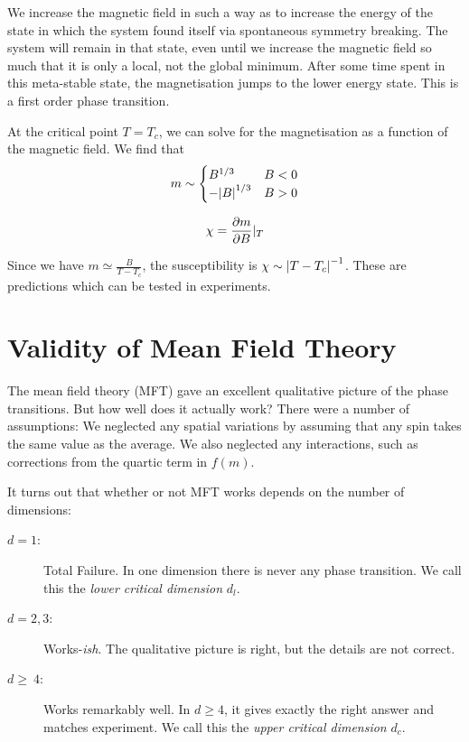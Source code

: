 We increase the magnetic field in such a way as to increase the energy of the state in which the system found itself via spontaneous symmetry breaking.
The system will remain in that state, even until we increase the magnetic field so much that it is only a local, not the global minimum.
After some time spent in this meta-stable state, the magnetisation jumps to the lower energy state.
This is a first order phase transition.

At the critical point $T = T_c$, we can solve for the magnetisation as a function of the magnetic field. We find that 
\begin{equation}
  m \sim 
  \begin{cases}
    B^{1/3} & B < 0 \\
    -\abs{B}^{1/3} & B > 0
  \end{cases}
\end{equation}

\begin{definition}
  \begin{equation}
    \chi = \pdv{m}{B}\rvert_T
  \end{equation}
\end{definition}

Since we have $m \simeq \frac{B}{T - T_c}$, the susceptibility is $\chi \sim \abs{T - T_c}^{-1}$.
These are predictions which can be tested in experiments.

\section{Validity of Mean Field Theory}%
\label{sec:validity_of_mean_field_theory}

The mean field theory (MFT) gave an excellent qualitative picture of the phase transitions. But how well does it actually work?
There were a number of assumptions: We neglected any spatial variations by assuming that any spin takes the same value as the average. We also neglected any interactions, such as corrections from the quartic term in $f(m)$.

It turns out that whether or not MFT works depends on the number of dimensions:
\begin{description}
  \item[$d = 1$:] Total Failure. In one dimension there is never any phase transition. We call this the \emph{lower critical dimension} $d_l$.
  \item[$d = 2,3$:] Works-\emph{ish}. The qualitative picture is right, but the details are not correct.
  \item[$d \geqslant~4$:] Works remarkably well. In $d \geq 4$, it gives exactly the right answer and matches experiment.
    We call this the \emph{upper critical dimension} $d_c$.
\end{description}

